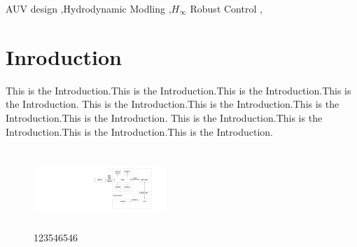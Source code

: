 \documentclass[a4paper,fleqn]{cas-dc}
\begin{document}



\begin{abstract}[S U M M A R Y]
  This is the abstract. This is the abstract. This is the abstract. This is the abstract. 
  This is the abstract. This is the abstract. This is the abstract. This is the abstract. 
  This is the abstract. This is the abstract. This is the abstract. This is the abstract. 
  This is the abstract. This is the abstract. This is the abstract. This is the abstract. 
  This is the abstract. 
\end{abstract}





\begin{keywords}
  AUV design \sep Hydrodynamic Modling \sep \emph{$H_\infty$} Robust Control \sep 
\end{keywords}

\maketitle

\section{Inroduction}\label{Indro}
This is the Introduction.This is the Introduction.This is the Introduction.This is the Introduction.
This is the Introduction.This is the Introduction.This is the Introduction.This is the Introduction.
This is the Introduction.This is the Introduction.This is the Introduction.This is the Introduction. 

\begin{figure}
	\centering
		\includegraphics[width=5cm,height=3cm]{1}
	  \caption{123546546}
    \label{fig1}
\end{figure}
\end{document}
